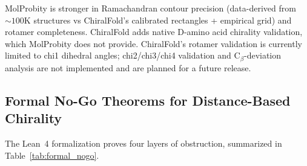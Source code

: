 \documentclass[11pt]{article}
\begin{document}
MolProbity is stronger in Ramachandran contour precision (data-derived from ${\sim}100$K structures vs ChiralFold's calibrated rectangles + empirical grid) and rotamer completeness. ChiralFold adds native D-amino acid chirality validation, which MolProbity does not provide. ChiralFold's rotamer validation is currently limited to chi1 dihedral angles; chi2/chi3/chi4 validation and C$_\beta$-deviation analysis are not implemented and are planned for a future release.

\subsection{Formal No-Go Theorems for Distance-Based Chirality}
\label{sec:formal_nogo}

The Lean~4 formalization proves four layers of obstruction, summarized in Table~\ref{tab:formal_nogo}.

\begin{table}[ht]
\centering
\caption{Machine-checked no-go theorems for distance-based chirality (Lean~4; \texttt{formal/chirality\_nogo/}). All proofs are \texttt{sorry}-free.}
\label{tab:formal_nogo}
\end{table}
\end{document}

